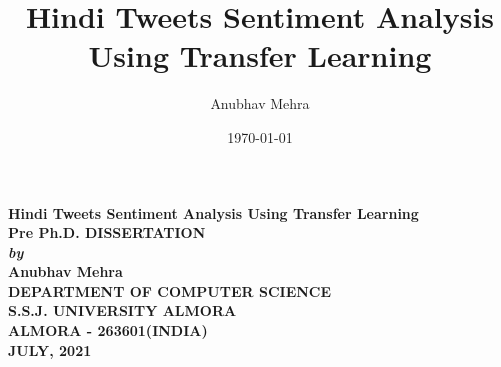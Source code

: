 \documentclass[a4paper, 12pt]{article}
\title{Hindi Tweets Sentiment Analysis Using Transfer Learning}
\author{Anubhav Mehra}
\date{\today}
\begin{document}
\begin{titlepage}
	\begin{center}
		\vspace*{1cm}
			\Large{\textbf{Hindi Tweets Sentiment Analysis Using Transfer Learning}}\\
			\vspace*{3cm}
			\large{\textbf{Pre Ph.D. DISSERTATION}}\\
			\vspace*{3cm}
			\large{\textit{\textbf{by}}} \\
			\vspace*{3cm}
			\large{\textbf{Anubhav Mehra}}\\
			\vfill
			\Large{\textbf{DEPARTMENT OF COMPUTER SCIENCE \\ S.S.J. UNIVERSITY ALMORA \\ ALMORA - 263601(INDIA) \\ JULY, 2021}}
			
			\normalsize
			
	\end{center}
\end{titlepage}
\end{document}
